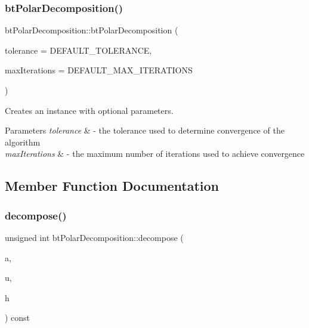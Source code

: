 \subsubsection{\texorpdfstring{bt\+Polar\+Decomposition()}{btPolarDecomposition()}\hspace{0.1cm}{\footnotesize\ttfamily [2/2]}}
{\footnotesize\ttfamily bt\+Polar\+Decomposition\+::bt\+Polar\+Decomposition (\begin{DoxyParamCaption}\item[{bt\+Scalar}]{tolerance = {\ttfamily DEFAULT\+\_\+TOLERANCE},  }\item[{unsigned int}]{max\+Iterations = {\ttfamily DEFAULT\+\_\+MAX\+\_\+ITERATIONS} }\end{DoxyParamCaption})}

Creates an instance with optional parameters.


\begin{DoxyParams}{Parameters}
{\em tolerance} & -\/ the tolerance used to determine convergence of the algorithm \\
\hline
{\em max\+Iterations} & -\/ the maximum number of iterations used to achieve convergence \\
\hline
\end{DoxyParams}


\subsection{Member Function Documentation}
\mbox{\label{classbtPolarDecomposition_a1f9cd6a03f284aa2fa6b1995f4ebf332}} 
\subsubsection{\texorpdfstring{decompose()}{decompose()}\hspace{0.1cm}{\footnotesize\ttfamily [1/2]}}
{\footnotesize\ttfamily unsigned int bt\+Polar\+Decomposition\+::decompose (\begin{DoxyParamCaption}\item[{const bt\+Matrix3x3 \&}]{a,  }\item[{bt\+Matrix3x3 \&}]{u,  }\item[{bt\+Matrix3x3 \&}]{h }\end{DoxyParamCaption}) const}

